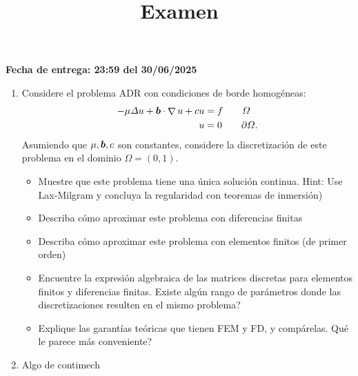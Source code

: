 \documentclass{article}
\title{Examen}
\date{}
\renewcommand{\vec}{\vectorsym}
\DeclareMathOperator{\grad}{\nabla}
\begin{document}
\maketitle
\hfill \textbf{Fecha de entrega: 23:59 del 30/06/2025}
 

\begin{enumerate}

    \item Considere el problema ADR con condiciones de borde homogéneas:
            $$ \begin{aligned}
                -\mu \Delta u + \vec b \cdot \grad u + c u &= f \qquad \Omega \\
                u &= 0 \qquad \partial\Omega.
            \end{aligned}$$
            Asumiendo que $\mu,\vec b,c$ son constantes, considere la discretización de este problema en el dominio $\Omega = (0,1)$. 
            \begin{itemize}
                \item Muestre que este problema tiene una única solución continua. Hint: Use Lax-Milgram y concluya la regularidad con teoremas de inmersión)
                \item Describa cómo aproximar este problema con diferencias finitas 
                \item Describa cómo aproximar este problema con elementos finitos (de primer orden)
                \item Encuentre la expresión algebraica de las matrices discretas para elementos finitos y diferencias finitas. Existe algún rango de parámetros donde las discretizaciones resulten en el mismo problema? 
                \item Explique las garantías teóricas que tienen FEM y FD, y compárelas. Qué le parece más conveniente? 
            \end{itemize}

    \item Algo de contimech
\end{enumerate}

\end{document}
